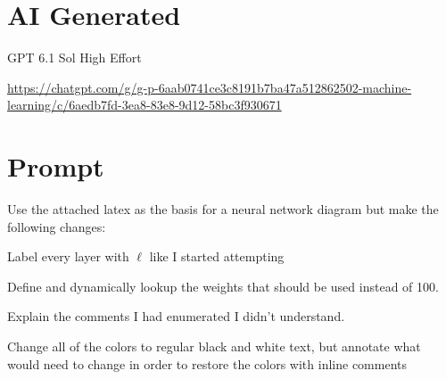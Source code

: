 \documentclass[tikz]{article}
\begin{document}
\section{AI Generated}
GPT 6.1 Sol High Effort

\url{https://chatgpt.com/g/g-p-6aab0741ce3c8191b7ba47a512862502-machine-learning/c/6aedb7fd-3ea8-83e8-9d12-58bc3f930671}


\section{Prompt}
Use the attached latex as the basis for a neural network diagram but make the following changes:

Label every layer with $\ell$ like I started attempting

Define and dynamically lookup the weights that should be used instead of 100.

Explain the comments I had enumerated I didn't understand.

Change all of the colors to regular black and white text, but annotate what would need to change in order to restore the colors with inline comments
\end{document}
